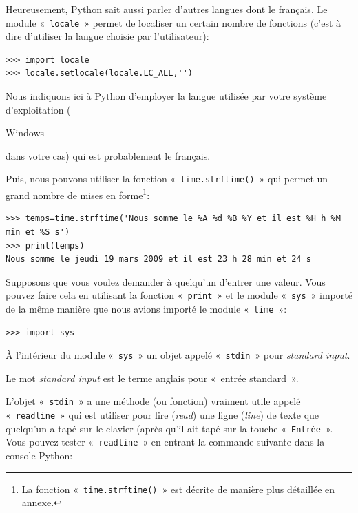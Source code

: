 Heureusement, Python sait aussi parler d'autres langues dont le français. Le module « \texttt{locale} » permet de localiser un certain nombre de fonctions (c'est à dire d'utiliser la langue choisie par l'utilisateur):

\begin{Verbatim}[frame=single,rulecolor=\color{mbleu}, label=à taper]
>>> import locale
>>> locale.setlocale(locale.LC_ALL,'')
\end{Verbatim}

Nous indiquons ici à Python d'employer la langue utilisée par votre système d'exploitation (\begin{WINDOWS}Windows\end{WINDOWS} dans votre cas) qui est probablement le français.

Puis, nous pouvons utiliser la fonction « \texttt{time.strftime()} » qui permet un grand nombre de mises en forme\footnote{La fonction « \texttt{time.strftime()} » est décrite de manière plus détaillée en annexe.}:

\begin{small}
\begin{Verbatim}[frame=single,rulecolor=\color{mbleu}, label=à taper]
>>> temps=time.strftime('Nous somme le %A %d %B %Y et il est %H h %M min et %S s')
>>> print(temps)
Nous somme le jeudi 19 mars 2009 et il est 23 h 28 min et 24 s
\end{Verbatim}
\end{small}

Supposons que vous voulez demander à quelqu'un d'entrer une valeur. Vous pouvez faire cela en utilisant la fonction
« \texttt{print} » et le module « \texttt{sys} » importé de la même manière que nous avions importé le module « \texttt{time} »: 

\begin{Verbatim}[frame=single,rulecolor=\color{mbleu}, label=à taper]
>>> import sys
\end{Verbatim}

À l'intérieur du module « \texttt{sys} » un objet appelé « \texttt{stdin} » pour \emph{standard input}.

Le mot \emph{standard input} est le terme anglais pour « entrée standard ».

L'objet « \texttt{stdin} » a une méthode (ou fonction) vraiment utile appelé  « \texttt{readline} » qui est utiliser pour lire (\emph{read}) une ligne (\emph{line}) de texte que quelqu'un a tapé sur le clavier (après qu'il ait tapé sur la touche « \texttt{Entrée} ». Vous pouvez tester « \texttt{readline} » en entrant la commande suivante dans la console Python:

